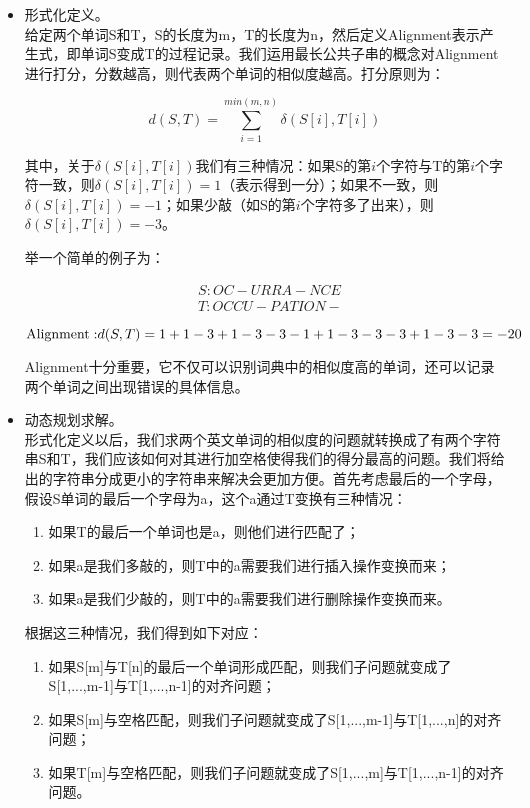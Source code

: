 \documentclass[UTF8,a4paper]{ctexart}
\begin{document}
\begin{itemize}
  \item 形式化定义。 \\
  给定两个单词S和T，S的长度为m，T的长度为n，然后定义Alignment表示产生式，即单词S变成T的过程记录。我们运用最长公共子串的概念对Alignment进行打分，分数越高，则代表两个单词的相似度越高。打分原则为：

  \[
  d(S,T)=\sum_{i=1}^{min(m,n)}\delta(S[i],T[i])
  \]

  其中，关于$\delta(S[i],T[i])$我们有三种情况：如果S的第$i$个字符与T的第$i$个字符一致，则$\delta(S[i],T[i])=1$（表示得到一分）；如果不一致，则$\delta(S[i],T[i])=-1$；如果少敲（如S的第$i$个字符多了出来），则$\delta(S[i],T[i])=-3$。

  举一个简单的例子为：

  \[
  \begin{aligned}
    & S: OC-URRA-NCE \\
    & T: OCCU-PATION-
  \end{aligned}
  \]

  \[
  {\rm{Alignment:}} d(S,T)=1+1-3+1-3-3-1+1-3-3-3+1-3-3=-20
  \]

  Alignment十分重要，它不仅可以识别词典中的相似度高的单词，还可以记录两个单词之间出现错误的具体信息。

  \item 动态规划求解。 \\
  形式化定义以后，我们求两个英文单词的相似度的问题就转换成了有两个字符串S和T，我们应该如何对其进行加空格使得我们的得分最高的问题。我们将给出的字符串分成更小的字符串来解决会更加方便。首先考虑最后的一个字母，假设S单词的最后一个字母为a，这个a通过T变换有三种情况：

  \begin{enumerate}
    \item 如果T的最后一个单词也是a，则他们进行匹配了；
    \item 如果a是我们多敲的，则T中的a需要我们进行插入操作变换而来；
    \item 如果a是我们少敲的，则T中的a需要我们进行删除操作变换而来。
  \end{enumerate}

  根据这三种情况，我们得到如下对应：

  \begin{enumerate}
    \item 如果S[m]与T[n]的最后一个单词形成匹配，则我们子问题就变成了S[1,...,m-1]与T[1,...,n-1]的对齐问题；
    \item 如果S[m]与空格匹配，则我们子问题就变成了S[1,...,m-1]与T[1,...,n]的对齐问题；
    \item 如果T[m]与空格匹配，则我们子问题就变成了S[1,...,m]与T[1,...,n-1]的对齐问题。
  \end{enumerate}


\end{itemize}
\end{document}
